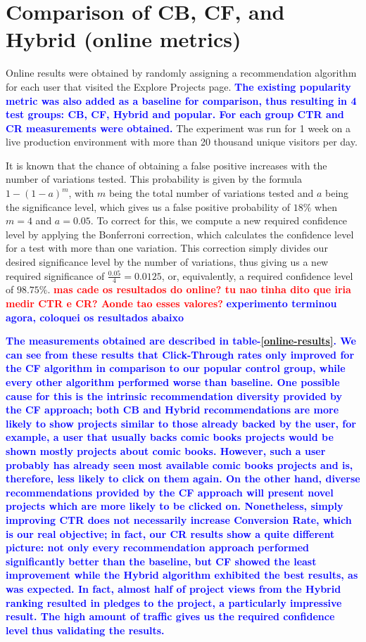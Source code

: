 \documentclass[cic,tc,english]{iiufrgs}
\newcommand{\bruno}[1]{\textcolor{red}{\textbf{#1}}}
\newcommand{\adriano}[1]{\textcolor{blue}{\textbf{#1}}}
\begin{document}
\section{Comparison of CB, CF, and Hybrid (online metrics)} \label{online-evaluation}
Online results were obtained by randomly assigning a recommendation algorithm for each user that visited the Explore Projects page. \adriano{The existing popularity metric was also added as a baseline for comparison, thus resulting in 4 test groups: CB, CF, Hybrid and popular. For each group CTR and CR measurements were obtained.} The experiment was run for 1 week on a live production environment with more than 20 thousand unique visitors per day.

It is known that the chance of obtaining a false positive increases with the number of variations tested. This probability is given by the formula $1-(1-a)^m$, with $m$ being the total number of variations tested and $a$ being the significance level, which gives us a false positive probability of $18\%$ when $m=4$ and $a=0.05$. To correct for this, we compute a new required confidence level by applying the Bonferroni correction, which calculates the confidence level for a test with more than one variation. This correction simply divides our desired significance level by the number of variations,  thus giving us a new required significance of $\frac{0.05}{4}=0.0125$, or, equivalently, a required confidence level of $98.75\%$. \bruno{mas cade os resultados do online? tu nao tinha dito que iria medir CTR e CR? Aonde tao esses valores?} \adriano{experimento terminou agora, coloquei os resultados abaixo}

\adriano{The measurements obtained are described in table-\ref{online-results}. We can see from these results that Click-Through rates only improved for the CF algorithm in comparison to our popular control group, while every other algorithm performed worse than baseline. One possible cause for this is the intrinsic recommendation diversity provided by the CF approach; both CB and Hybrid recommendations are more likely to show projects similar to those already backed by the user, for example, a user that usually backs comic books projects would be shown mostly projects about comic books. However, such a user probably has already seen most available comic books projects and is, therefore, less likely to click on them again. On the other hand, diverse recommendations provided by the CF approach will present novel projects which are more likely to be clicked on. Nonetheless, simply improving CTR does not necessarily increase Conversion Rate, which is our real objective; in fact, our CR results show a quite different picture: not only every recommendation approach performed significantly better than the baseline, but CF showed the least improvement while the Hybrid algorithm exhibited the best results, as was expected. In fact, almost half of project views from the Hybrid ranking resulted in pledges to the project, a particularly impressive result. The high amount of traffic gives us the required confidence level thus validating the results.}
\end{document}
